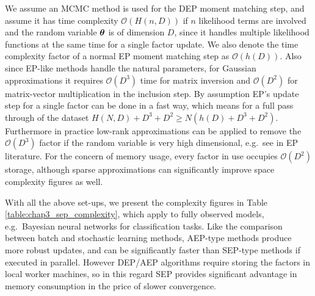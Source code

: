 We assume an MCMC method is used for the DEP moment matching step, and assume it has time complexity $\mathcal{O}(H(n, D))$ if $n$ likelihood terms are involved and the random variable $\bm{\theta}$ is of dimension $D$, since it handles multiple likelihood functions at the same time for a single factor update. We also denote the time complexity factor of a normal EP moment matching step as $\mathcal{O}(h(D))$. Also since EP-like methods handle the natural parameters, for Gaussian approximations it requires $\mathcal{O}(D^3)$ time for matrix inversion and $\mathcal{O}(D^2)$ for matrix-vector multiplication in the inclusion step. By assumption EP's update step for a single factor can be done in a fast way, which means for a full pass through of the dataset $H(N, D) + D^3 + D^2 \geq N ( h(D) + D^3 + D^2)$. Furthermore in practice low-rank approximations can be applied to remove the $\mathcal{O}(D^3)$ factor if the random variable is very high dimensional, e.g.~see \cite{qi+minka:sparseGP2010} in EP literature. For the concern of memory usage, every factor in use occupies $\mathcal{O}(D^2)$ storage, although sparse approximations can significantly improve space complexity figures as well.

With all the above set-ups, we present the complexity figures in Table \ref{table:chap3_sep_complexity}, which apply to fully observed models, e.g.~Bayesian neural networks for classification tasks. Like the comparison between batch and stochastic learning methods, AEP-type methods produce more robust updates, and can be significantly faster than SEP-type methods if executed in parallel. However DEP/AEP algorithms require storing the factors in local worker machines, so in this regard SEP provides significant advantage in memory consumption in the price of slower convergence. 

